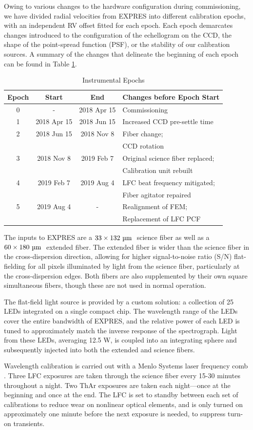 Owing to various changes to the hardware configuration during commissioning, we have divided radial velocities from EXPRES into different calibration epochs, with an independent RV offset fitted for each epoch. Each epoch demarcates changes introduced to the configuration of the echellogram on the CCD, the shape of the point-spread function (PSF), or the stability of our calibration sources. A summary of the changes that delineate the beginning of each epoch can be found in Table \ref{tab:epochs}.

\begin{table}[ht!]
\centering
\caption[EXPRES Instrumental Epochs]{Instrumental Epochs\label{tab:epochs}}
\begin{tabular}{cccl}
\hline
Epoch & Start & End & Changes before Epoch Start \tabularnewline
\hline
0 & - & 2018 Apr 15 & Commissioning \tabularnewline
1 & 2018 Apr 15 & 2018 Jun 15 & Increased CCD pre-settle time \tabularnewline
2 & 2018 Jun 15 & 2018 Nov 8 & Fiber change; \tabularnewline
 & & & CCD rotation \tabularnewline
3 & 2018 Nov 8 & 2019 Feb 7 & Original science fiber replaced; \tabularnewline
 & & &  Calibration unit rebuilt \tabularnewline
4 & 2019 Feb 7 & 2019 Aug 4 & LFC beat frequency mitigated; \tabularnewline
 & & &  Fiber agitator repaired \tabularnewline
5 & 2019 Aug 4 & - & Realignment of FEM; \tabularnewline
& & &  Replacement of LFC PCF
\tabularnewline
\hline
\end{tabular}
\end{table}

The inputs to EXPRES are a $33 \times 132 ~\si{\micro\meter}~$ science fiber as well as a $60 \times 180 ~\si{\micro\meter}~$ extended fiber. The extended fiber is wider than the science fiber in the cross-dispersion direction, allowing for higher signal-to-noise ratio (S/N) flat-fielding for all pixels illuminated by light from the science fiber, particularly at the cross-dispersion edges. Both fibers are also supplemented by their own square simultaneous fibers, though these are not used in normal operation.

The flat-field light source is provided by a custom solution: a collection of 25 LEDs integrated on a single compact chip. The wavelength range of the LEDs cover the entire bandwidth of EXPRES, and the relative power of each LED is tuned to approximately match the inverse response of the spectrograph. Light from these LEDs, averaging 12.5 W, is coupled into an integrating sphere and subsequently injected into both the extended and science fibers.

Wavelength calibration is carried out with a Menlo Systems laser frequency comb \citep[LFC; similar to those in][]{steinmetz_laser_2008,probst_relative_2016}. Three LFC exposures are taken through the science fiber every 15-30 minutes throughout a night.  Two ThAr exposures are taken each night---once at the beginning and once at the end. The LFC is set to standby between each set of calibrations to reduce wear on nonlinear optical elements, and is only turned on approximately one minute before the next exposure is needed, to suppress turn-on transients.

